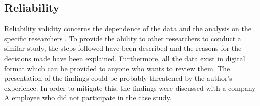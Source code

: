 \subsection{Reliability}
Reliability validity concerns the dependence of the data and the analysis on the specific researchers \cite{Wohlin}. To provide the ability to other researchers to conduct a similar study, the steps followed have been described and the reasons for the decisions made have been explained. Furthermore, all the data exist in digital format which can be provided to anyone who wants to review them. The presentation of the findings could be probably threatened by the author's experience. In order to mitigate this, the findings were discussed with a company A employee who did not participate in the case study.






